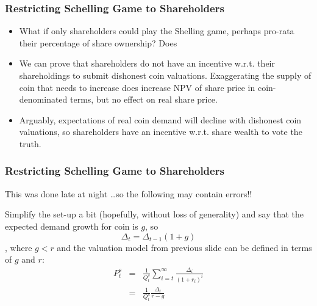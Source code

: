 \documentclass{beamer}
\begin{document}
\begin{frame}
  \frametitle{Restricting Schelling Game to Shareholders}

  \begin{itemize}
  \item What if only shareholders could play the Shelling game,
    perhaps pro-rata their percentage of share ownership? Does
  \item We can prove that shareholders do not have an incentive
    w.r.t. their shareholdings to submit dishonest coin
    valuations. Exaggerating the supply of coin that needs to increase
    does increase NPV of share price in coin-denominated terms, but no
    effect on real share price.
  \item Arguably, expectations of real coin demand will decline with
    dishonest coin valuations, so shareholders have an incentive
    w.r.t. share wealth to vote the truth. 
  \end{itemize}

\end{frame}

\begin{frame}
  \frametitle{Restricting Schelling Game to Shareholders}

  \begin{alertblock}{This was done late at night}
    \dots so the following may contain errors!! 
  \end{alertblock}

  Simplify the set-up a bit (hopefully, without loss of generality)
  and say that the expected demand growth for coin is $g$, so 
  \begin{equation}
    \Delta_{t} = \Delta_{t-1}(1+g)
  \end{equation}
  , where $g<r$ and the valuation model from previous slide can be
  defined in terms of $g$ and $r$:
  \begin{eqnarray}
    P^{s}_{t} &=&
    \frac{1}{Q^{s}_{t}}\sum\limits_{i=t}^{\infty}\frac{\Delta_{i}}{(1+r_{i})^{i}}\\
            &=& \frac{1}{Q^{s}_{t}}\frac{\Delta_{t}}{r-g}
  \end{eqnarray}

\end{frame}
\end{document}
